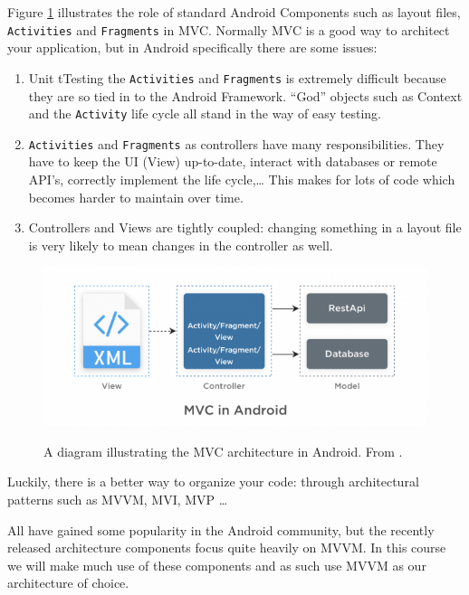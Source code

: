 Figure \ref{fig:MVCdiagram} illustrates the role of standard Android Components such as layout files, \lstinline!Activities! and \lstinline!Fragments! in MVC.
Normally MVC is a good way to architect your application, but in Android specifically there are some issues:

\begin{enumerate}
	\item Unit tTesting the \lstinline!Activities! and \lstinline!Fragments! is extremely difficult because they are so tied in to the Android Framework.
	``God'' objects such as Context and the \lstinline!Activity! life cycle all stand in the way of easy testing.
	\item \lstinline!Activities! and \lstinline!Fragments! as controllers have many responsibilities. 
	They have to keep the UI (View) up-to-date, interact with databases or remote API's, correctly implement the life cycle,\ldots
	This makes for lots of code which becomes harder to maintain over time.
	\item Controllers and Views are tightly coupled: changing something in a layout file is very likely to mean changes in the controller as well. 
\end{enumerate}

\begin{figure}[ht]
	\centering
	\includegraphics[width=\textwidth]{images/mvvm/MVC_diagram.png}
	\label{fig:MVCdiagram}
	\caption{A diagram illustrating the MVC architecture in Android. From \cite{simform}.}
\end{figure}

Luckily, there is a better way to organize your code: through architectural patterns such as MVVM, MVI, MVP \ldots

All have gained some popularity in the Android community, but the recently released architecture components \cite{architectureComponents} focus quite heavily on MVVM.
In this course we will make much use of these components and as such use MVVM as our architecture of choice.

